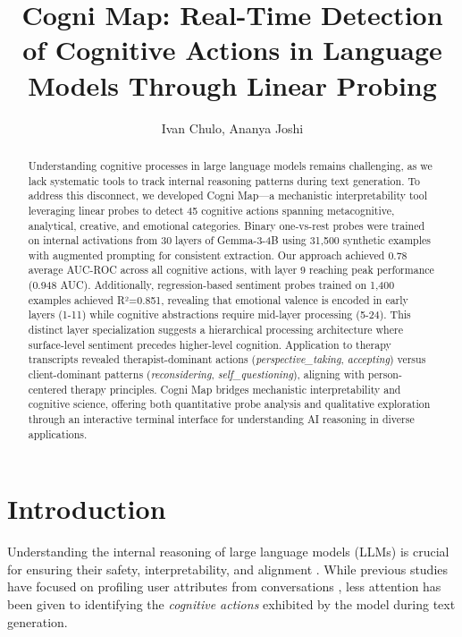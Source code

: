 \documentclass[letterpaper]{article}
\title{Cogni Map: Real-Time Detection of Cognitive Actions in Language Models Through Linear Probing}
\author{
    Ivan Chulo, Ananya Joshi
}
\begin{document}
\maketitle

\begin{abstract}
Understanding cognitive processes in large language models remains challenging, as we lack systematic tools to track internal reasoning patterns during text generation. To address this disconnect, we developed Cogni Map—a mechanistic interpretability tool leveraging linear probes to detect 45 cognitive actions spanning metacognitive, analytical, creative, and emotional categories. Binary one-vs-rest probes were trained on internal activations from 30 layers of Gemma-3-4B using 31,500 synthetic examples with augmented prompting for consistent extraction. Our approach achieved 0.78 average AUC-ROC across all cognitive actions, with layer 9 reaching peak performance (0.948 AUC). Additionally, regression-based sentiment probes trained on 1,400 examples achieved R²=0.851, revealing that emotional valence is encoded in early layers (1-11) while cognitive abstractions require mid-layer processing (5-24). This distinct layer specialization suggests a hierarchical processing architecture where surface-level sentiment precedes higher-level cognition. Application to therapy transcripts revealed therapist-dominant actions (\textit{perspective\_taking}, \textit{accepting}) versus client-dominant patterns (\textit{reconsidering}, \textit{self\_questioning}), aligning with person-centered therapy principles. Cogni Map bridges mechanistic interpretability and cognitive science, offering both quantitative probe analysis and qualitative exploration through an interactive terminal interface for understanding AI reasoning in diverse applications.
\end{abstract}

\section{Introduction}

Understanding the internal reasoning of large language models (LLMs) is crucial for ensuring their safety, interpretability, and alignment \cite{bereska2024mechanistic}. While previous studies have focused on profiling user attributes from conversations \cite{chen2024designing}, less attention has been given to identifying the \textit{cognitive actions} exhibited by the model during text generation.
\end{document}
